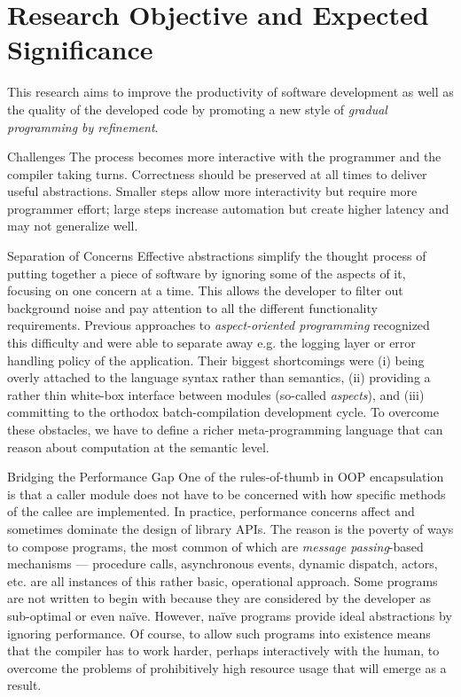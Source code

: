\section{Research Objective and Expected Significance}

This research aims to improve the productivity of software development
as well as the quality of the developed code by promoting a new style
of \emph{gradual programming by refinement}.

\begin{paragraph}{Challenges}
The process becomes more interactive with the programmer and the
compiler taking turns. Correctness should be preserved at all times
to deliver useful abstractions.
Smaller steps allow more interactivity but require more programmer
effort; large steps increase automation but create higher latency
and may not generalize well.
\end{paragraph}

\begin{paragraph}{Separation of Concerns}
Effective abstractions simplify the thought process of putting together
a piece of software by ignoring some of the aspects of it, focusing on
one concern at a time. This allows the developer to filter out background
noise and pay attention to all the different functionality requirements.
Previous approaches to \emph{aspect-oriented programming} recognized this
difficulty and were able to separate away e.g. the logging layer or error
handling policy of the application. Their biggest shortcomings were 
(i) being overly attached to the language syntax rather than semantics, 
(ii) providing a rather thin white-box interface between modules
    (so-called \emph{aspects}), and
(iii) committing to the orthodox batch-compilation development cycle.
To overcome these obstacles, we have to define a richer meta-programming
language that can reason about computation at the semantic level.
\end{paragraph}

\begin{subparagraph}{Bridging the Performance Gap}
One of the rules-of-thumb in OOP encapsulation is that a caller module
does not have to be concerned with how specific methods of the callee are
implemented. In practice, performance concerns affect and sometimes dominate
the design of library APIs.
The reason is the poverty of ways to compose programs, the most common of
which are \emph{message passing}-based mechanisms --- procedure calls,
asynchronous events, dynamic dispatch, actors, etc. are all instances of
this rather basic, operational approach.
Some programs are not written to begin with because they are considered
by the developer as sub-optimal or even na\"ive.
However, na\"ive programs provide ideal abstractions by ignoring performance.
Of course, to allow such programs into existence means that the compiler
has to work harder, perhaps interactively with the human, to overcome the
problems of prohibitively high resource usage that will emerge as a result.
\end{subparagraph}

